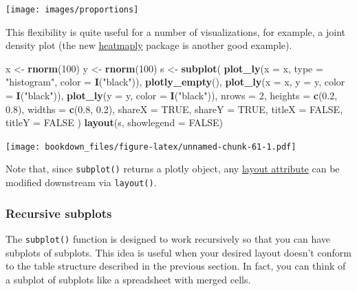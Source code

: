 \documentclass[12pt,]{isuthesis}
\newenvironment{Shaded}{\begin{snugshade}}{\end{snugshade}}
\newcommand{\KeywordTok}[1]{\textcolor[rgb]{0.13,0.29,0.53}{\textbf{{#1}}}}
\newcommand{\DataTypeTok}[1]{\textcolor[rgb]{0.13,0.29,0.53}{{#1}}}
\newcommand{\DecValTok}[1]{\textcolor[rgb]{0.00,0.00,0.81}{{#1}}}
\newcommand{\FloatTok}[1]{\textcolor[rgb]{0.00,0.00,0.81}{{#1}}}
\newcommand{\StringTok}[1]{\textcolor[rgb]{0.31,0.60,0.02}{{#1}}}
\newcommand{\OtherTok}[1]{\textcolor[rgb]{0.56,0.35,0.01}{{#1}}}
\newcommand{\NormalTok}[1]{{#1}}
\begin{document}
\texttt{[image: images/proportions]}

This flexibility is quite useful for a number of visualizations, for
example, a joint density plot (the new
\href{https://github.com/talgalili/heatmaply}{heatmaply} package is
another good example).

\begin{Shaded}
\begin{Highlighting}[]
\NormalTok{x <-}\StringTok{ }\KeywordTok{rnorm}\NormalTok{(}\DecValTok{100}\NormalTok{)}
\NormalTok{y <-}\StringTok{ }\KeywordTok{rnorm}\NormalTok{(}\DecValTok{100}\NormalTok{)}
\NormalTok{s <-}\StringTok{ }\KeywordTok{subplot}\NormalTok{(}
  \KeywordTok{plot_ly}\NormalTok{(}\DataTypeTok{x =} \NormalTok{x, }\DataTypeTok{type =} \StringTok{"histogram"}\NormalTok{, }\DataTypeTok{color =} \KeywordTok{I}\NormalTok{(}\StringTok{"black"}\NormalTok{)), }
  \KeywordTok{plotly_empty}\NormalTok{(), }
  \KeywordTok{plot_ly}\NormalTok{(}\DataTypeTok{x =} \NormalTok{x, }\DataTypeTok{y =} \NormalTok{y, }\DataTypeTok{color =} \KeywordTok{I}\NormalTok{(}\StringTok{"black"}\NormalTok{)), }
  \KeywordTok{plot_ly}\NormalTok{(}\DataTypeTok{y =} \NormalTok{y, }\DataTypeTok{color =} \KeywordTok{I}\NormalTok{(}\StringTok{"black"}\NormalTok{)),}
  \DataTypeTok{nrows =} \DecValTok{2}\NormalTok{, }\DataTypeTok{heights =} \KeywordTok{c}\NormalTok{(}\FloatTok{0.2}\NormalTok{, }\FloatTok{0.8}\NormalTok{), }\DataTypeTok{widths =} \KeywordTok{c}\NormalTok{(}\FloatTok{0.8}\NormalTok{, }\FloatTok{0.2}\NormalTok{), }
  \DataTypeTok{shareX =} \OtherTok{TRUE}\NormalTok{, }\DataTypeTok{shareY =} \OtherTok{TRUE}\NormalTok{, }\DataTypeTok{titleX =} \OtherTok{FALSE}\NormalTok{, }\DataTypeTok{titleY =} \OtherTok{FALSE}
\NormalTok{)}
\KeywordTok{layout}\NormalTok{(s, }\DataTypeTok{showlegend =} \OtherTok{FALSE}\NormalTok{)}
\end{Highlighting}
\end{Shaded}

\texttt{[image: bookdown\_files/figure-latex/unnamed-chunk-61-1.pdf]}

Note that, since \texttt{subplot()} returns a plotly object, any
\href{https://plot.ly/r/reference/\#layout}{layout attribute} can be
modified downstream via \texttt{layout()}.

\subsubsection{Recursive subplots}\label{recursive-subplots}

The \texttt{subplot()} function is designed to work recursively so that
you can have subplots of subplots. This idea is useful when your desired
layout doesn't conform to the table structure described in the previous
section. In fact, you can think of a subplot of subplots like a
spreadsheet with merged cells.
\end{document}
